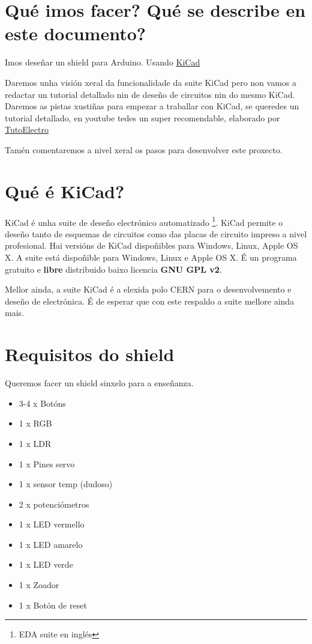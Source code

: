 \section{Qué imos facer? Qué se describe en este
documento?}\label{quuxe9-imos-facer-quuxe9-se-describe-en-este-documento}

Imos deseñar un shield para Arduino. Usando
\href{http://www.kicad-pcb.org/}{KiCad}

Daremos unha visión xeral da funcionalidade da suite KiCad pero non
vamos a redactar un tutorial detallado nin de deseño de circuitos nin do
mesmo KiCad. Daremos as pistas xustiñas para empezar a traballar con
KiCad, se queredes un tutorial detallado, en youtube tedes un super
recomendable, elaborado por
\href{https://www.youtube.com/playlist?list=PL1Hs_F1k2mdRVYDtdWd7tQKDZTfxop7np}{TutoElectro}

Tamén comentaremos a nivel xeral os pasos para desenvolver este
proxecto.

\section{Qué é KiCad?}\label{quuxe9-uxe9-kicad}

KiCad é unha suite de deseño electrónico automatizado \footnote{EDA
  suite en inglés}. KiCad permite o deseño tanto de esquemas de
circuitos como das placas de circuito impreso a nivel profesional. Hai
versións de KiCad dispoñibles para Windows, Linux, Apple OS X. A suite
está dispoñible para Windows, Linux e Apple OS X. É un programa gratuito
e \textbf{libre} distribuido baixo licencia \textbf{GNU GPL v2}.

Mellor ainda, a suite KiCad é a elexida polo CERN para o desenvolvemento
e deseño de electrónica. É de esperar que con este respaldo a suite
mellore ainda mais.

\section{Requisitos do shield}\label{requisitos-do-shield}

Queremos facer un shield sinxelo para a enseñanza.

\begin{itemize}
\itemsep1pt\parskip0pt
\item
  3-4 x Botóns
\item
  1 x RGB
\item
  1 x LDR
\item
  1 x Pines servo
\item
  1 x sensor temp (dudoso)
\item
  2 x potenciómetros
\item
  1 x LED vermello
\item
  1 x LED amarelo
\item
  1 x LED verde
\item
  1 x Zoador
\item
  1 x Botón de reset
\end{itemize}

